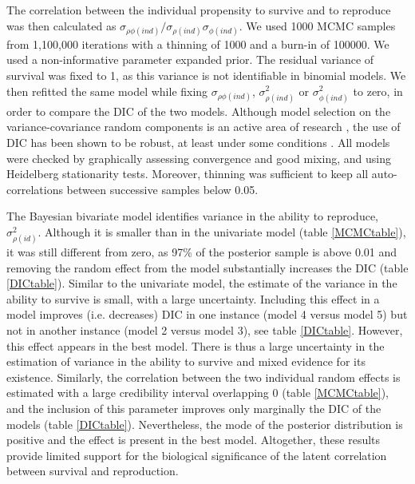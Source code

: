 The correlation between the individual propensity to survive and to reproduce was then calculated as $\sigma_{\rho \phi (ind)} /	\sigma_{\rho (ind)} \sigma_{\phi (ind)} $.
We used 1000 MCMC samples from 1,100,000 iterations with a thinning of 1000 and a burn-in of 100000. We used a non-informative parameter expanded prior. The residual variance of survival was fixed to 1, as this variance is not identifiable in binomial models.
We then refitted the same model while fixing $\sigma_{\rho \phi (ind)}$, $\sigma_{\rho (ind)}^2$ or $\sigma_{\phi (ind)}^2$ to zero, in order to compare the DIC of the two models. Although model selection on the variance-covariance random components is an active area of research \parencite[e.g.][chapter 6]{Burnham2002}, the use of DIC has been shown to be robust, at least under some conditions \parencite{Wilberg2008,Barnett2010}.
All models were checked by graphically assessing convergence and good mixing, and using Heidelberg stationarity tests. Moreover, thinning was sufficient to keep all auto-correlations between successive samples below 0.05. 

The Bayesian bivariate model identifies variance in the ability to reproduce, $\sigma_{\rho (id)}^2$. Although it is smaller than in the univariate model (table \ref{MCMCtable}), it was still different from zero, as 97\% of the posterior sample is above 0.01 and removing the random effect from the model substantially increases the DIC (table \ref{DICtable}).
Similar to the univariate model, the estimate of the variance in the ability to survive is small, with a large uncertainty. Including this effect in a model improves (i.e. decreases) DIC in one instance (model 4 versus model 5) but not in another instance (model 2 versus model 3), see table \ref{DICtable}. However, this effect appears in the best model. There is thus a large uncertainty in the estimation of variance in the ability to survive and mixed evidence for its existence.
Similarly, the correlation between the two individual random effects is estimated with a large credibility interval overlapping 0 (table \ref{MCMCtable}), and the inclusion of this parameter improves only marginally the DIC of the models (table \ref{DICtable}). Nevertheless, the mode of the posterior distribution is positive and the effect is present in the best model. Altogether, these results provide limited support for the biological significance of the latent correlation between survival and reproduction.

